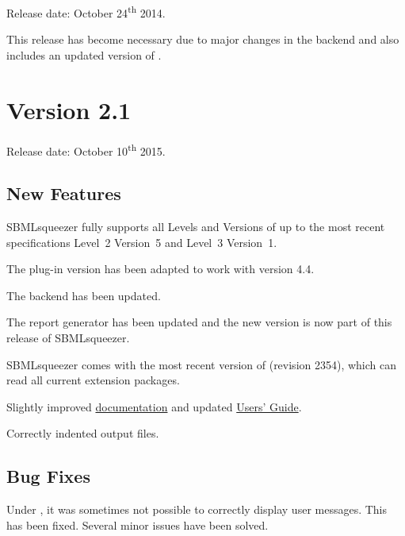 Release date: October 24\textsuperscript{th} 2014.

This release has become necessary due to major changes in the \Garuda backend
and also includes an updated version of \JSBML.

\section{Version 2.1}

Release date: October 10\textsuperscript{th} 2015.

\subsection{New Features}

\begin{dinglist}{52}
\item SBMLsqueezer fully supports all Levels and Versions of \SBML up to the most
recent specifications Level~2 Version~5 and Level~3 Version~1.
\item The \CellDesigner plug-in version has been adapted to work with version 4.4.
\item The \Garuda backend has been updated.
\item The report generator \SBMLLaTeX has been updated and the new version is now
      part of this release of SBMLsqueezer.
\item SBMLsqueezer comes with the most recent version of \JSBML (revision 2354),
      which can read all current extension packages.
\item Slightly improved \href{http://www.cogsys.cs.uni-tuebingen.de/software/SBMLsqueezer/doc/api/SBMLsqueezer2.1/}{\API documentation} and updated \href{http://vg08.met.vgwort.de/na/d4b8e9ae1bed423884cea07e52756b43?l=http://www.cogsys.cs.uni-tuebingen.de/software/SBMLsqueezer/doc/SBMLsqueezer2.1UsersGuide.pdf}{Users' Guide}.
\item Correctly indented \SBML output files.
\end{dinglist}  

\subsection{Bug Fixes}

Under \Windows, it was sometimes not possible to correctly display user messages.
This has been fixed. Several minor issues have been solved.
